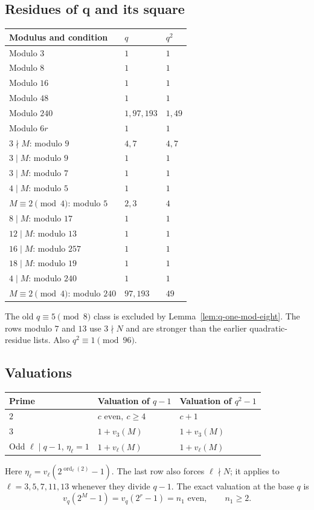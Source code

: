 \documentclass[11pt]{article}
\begin{document}
\subsection{Residues of q and its square}
{\small\renewcommand{\arraystretch}{1.15}
\begin{longtable}{@{}p{}p{}p{}@{}}
\textbf{Modulus and condition}&\textbf{$q$}&\textbf{$q^2$}\\\hline
\endhead
Modulo $3$&$1$&$1$\\
Modulo $8$&$1$&$1$\\
Modulo $16$&$1$&$1$\\
Modulo $48$&$1$&$1$\\
Modulo $240$&$1,97,193$&$1,49$\\
Modulo $6r$&$1$&$1$\\\hline
$3\nmid M$: modulo $9$&$4,7$&$4,7$\\
$3\mid M$: modulo $9$&$1$&$1$\\
$3\mid M$: modulo $7$&$1$&$1$\\
$4\mid M$: modulo $5$&$1$&$1$\\
$M\equiv2\pmod4$: modulo $5$&$2,3$&$4$\\
$8\mid M$: modulo $17$&$1$&$1$\\
$12\mid M$: modulo $13$&$1$&$1$\\
$16\mid M$: modulo $257$&$1$&$1$\\
$18\mid M$: modulo $19$&$1$&$1$\\\hline
$4\mid M$: modulo $240$&$1$&$1$\\
$M\equiv2\pmod4$: modulo $240$&$97,193$&$49$\\
\hline
\end{longtable}}
The old $q\equiv5\pmod8$ class is excluded by
Lemma~\ref{lem:q-one-mod-eight}. The rows modulo $7$ and $13$ use
$3\nmid N$ and are stronger than the earlier quadratic-residue lists.
Also $q^2\equiv1\pmod{96}$.

\subsection{Valuations}
{\small\renewcommand{\arraystretch}{1.2}\noindent
\begin{tabular}{@{}p{}p{}p{}@{}}
\textbf{Prime}&\textbf{Valuation of $q-1$}&\textbf{Valuation of $q^2-1$}\\\hline
$2$&$c\text{ even},\ c\ge4$&$c+1$\\
$3$&$1+v_3(M)$&$1+v_3(M)$\\
Odd $\ell\mid q-1$, $\eta_\ell=1$&$1+v_\ell(M)$&$1+v_\ell(M)$\\\hline
\end{tabular}\par}
\medskip\noindent
Here $\eta_\ell=v_\ell(2^{\operatorname{ord}_\ell(2)}-1)$.
The last row also forces $\ell\nmid N$; it applies to
$\ell=3,5,7,11,13$ whenever they divide $q-1$.
The exact valuation at the base $q$ is
\[
v_q(2^M-1)=v_q(2^r-1)=n_1\text{ even},\qquad n_1\ge2.
\]
\end{document}
